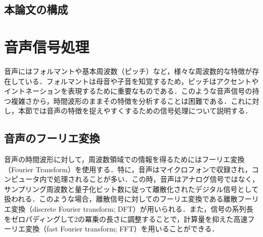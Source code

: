 \documentclass[12pt]{jarticle}
\numberwithin{equation}{section}    %
\numberwithin{figure}{section}      %
\numberwithin{table}{section}      %
\begin{document}
\subsection{本論文の構成}
\clearpage

\section{音声信号処理}
音声にはフォルマントや基本周波数（ピッチ）など，様々な周波数的な特徴が存在している．フォルマントは母音や子音を知覚するため，ピッチはアクセントやイントネーションを表現するために重要なものである．このような音声信号の持つ複雑さから，時間波形のままその特徴を分析することは困難である．これに対し，本節では音声の特徴を捉えやすくするための信号処理について説明する．

\subsection{音声のフーリエ変換}
音声の時間波形に対して，周波数領域での情報を得るためにはフーリエ変換（Fourier Transform）を使用する．特に，音声はマイクロフォンで収録され，コンピュータ内で処理されることが多い．この時，音声はアナログ信号ではなく，サンプリング周波数と量子化ビット数に従って離散化されたデジタル信号として扱われる．このような場合，離散信号に対してのフーリエ変換である離散フーリエ変換（discrete Fourier transform; DFT）が用いられる．また，信号の系列長をゼロパディングして2の冪乗の長さに調整することで，計算量を抑えた高速フーリエ変換（fast Fourier transform; FFT）を用いることができる．
\end{document}
